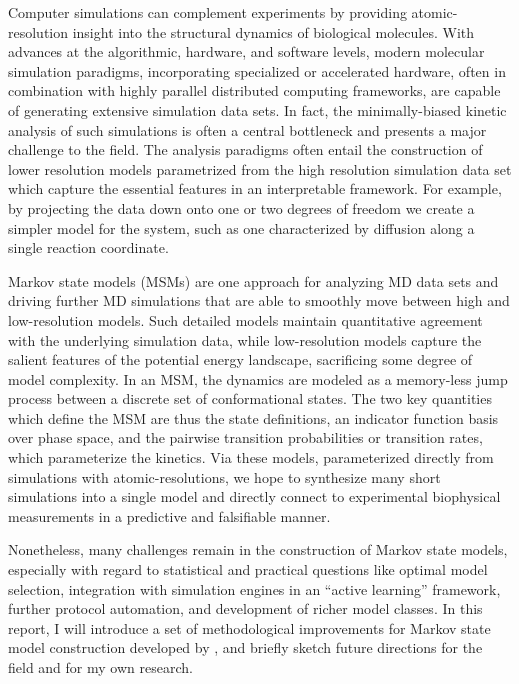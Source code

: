 \documentclass[twocolumn,floatfix,nofootinbib,aps]{revtex4-1}
\begin{document}
Computer simulations can complement experiments by providing atomic-resolution insight into the structural dynamics of biological molecules. With advances at the algorithmic, hardware, and software levels, modern molecular simulation paradigms, incorporating specialized or accelerated hardware, often in combination with highly parallel distributed computing frameworks, are capable of generating extensive simulation data sets\cite{Eastman2013OpenMM, Shirts2000Screen, Shaw2009Millisecond, Hess2008PLINCS}. In fact, the minimally-biased kinetic analysis of such simulations is often a central bottleneck and presents a major challenge to the field. The analysis paradigms often entail the construction of lower resolution models parametrized from the high resolution simulation data set which capture the essential features in an interpretable framework\cite{Freddolino2010Challenges, Lane2013Milliseconds}. For example, by projecting the data down onto one or two degrees of freedom we create a simpler model for the system, such as one characterized by diffusion along a single reaction coordinate\cite{Best2010Coordinate}.

Markov state models (MSMs) are one approach for analyzing MD data sets and driving further MD simulations that are able to smoothly move between high and low-resolution models\cite{Pande2010Everything, Beauchamp2012Simple, Prinz2011Markov, Bowman2013Quantitative}. Such detailed models maintain quantitative agreement with the underlying simulation data, while low-resolution models capture the salient features of the potential energy landscape, sacrificing some degree of model complexity. In an MSM, the dynamics are modeled as a memory-less jump process between a discrete set of conformational states. The two key quantities which define the MSM are thus the state definitions, an indicator function basis over phase space, and the pairwise transition probabilities or transition rates, which parameterize the kinetics. Via these models, parameterized directly from simulations with atomic-resolutions, we hope to synthesize many short simulations into a single model and directly connect to experimental biophysical measurements in a predictive and falsifiable manner.

Nonetheless, many challenges remain in the construction of Markov state models, especially with regard to statistical and practical questions like optimal model selection, integration with simulation engines in an ``active learning'' framework, further protocol automation, and development of richer model classes. In this report, I will introduce a set of methodological improvements for Markov state model construction developed by \textcite{McGibbon2013Learning}, and briefly sketch future directions for the field and for my own research. 
\end{document}

